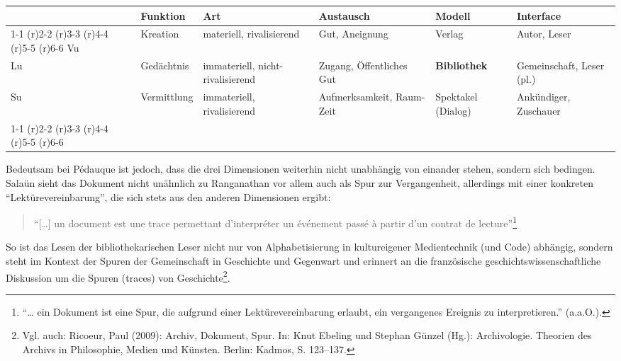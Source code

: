 \begin{sidewaystable}
\small
\begin{tabular}{p{0.5cm}p{1.5cm}p{2cm}p{3cm}p{1.5cm}p{2cm}}
 \toprule
 & Funktion & Art & Austausch & Modell & Interface \\
 \cmidrule(r){1-1} \cmidrule(r){2-2} \cmidrule(r){3-3} \cmidrule(r){4-4} \cmidrule(r){5-5} \cmidrule(r){6-6}
 Vu & Kreation & materiell, rivalisierend & Gut, Aneignung & Verlag &
 Autor, Leser\\
 Lu & Gedächtnis & immateriell, nicht-rivali\-sierend & Zugang,
 Öffentliches Gut & \textbf{Bibliothek} & Gemeinschaft, Leser
 (pl.)\\
 Su & Vermittlung & immateriell, rivalisierend & Aufmerksamkeit,
 Raum-Zeit & Spektakel (Dialog) & Ankündiger, Zuschauer\\
 \cmidrule(r){1-1} \cmidrule(r){2-2} \cmidrule(r){3-3} \cmidrule(r){4-4} \cmidrule(r){5-5} \cmidrule(r){6-6}
 \bottomrule
 \end{tabular}
 \caption*{Vu - Lu - Su (nach J.M. Salaün 2012, chap. 4; meine
 +Übertragung)}
 \end{sidewaystable}
 
Bedeutsam bei Pédauque ist jedoch, dass die drei Dimensionen weiterhin
nicht unabhängig von einander stehen, sondern sich bedingen. Salaün
sieht das Dokument nicht unähnlich zu Ranganathan vor allem auch als
Spur zur Vergangenheit, allerdings mit einer konkreten
\enquote{Lektürevereinbarung}, die sich stets aus den anderen
Dimensionen ergibt:

\begin{quote}
\enquote{{[}\ldots{}{]} un document est une trace permettant
d'interpréter un événement passé à partir d'un contrat de
lecture}\footnote{\enquote{\ldots{} ein Dokument ist eine Spur, die
  aufgrund einer Lektürevereinbarung erlaubt, ein vergangenes Ereignis
  zu interpretieren.} (a.a.O.).}
\end{quote}

So ist das Lesen der bibliothekarischen Leser nicht nur von
Alphabetisierung in kultureigener Medientechnik (und Code) abhängig,
sondern steht im Kontext der Spuren der Gemeinschaft in Geschichte und
Gegenwart und erinnert an die französische geschichtswissenschaftliche
Diskussion um die Spuren (traces) von Geschichte\footnote{Vgl. auch:
  Ricoeur, Paul (2009): Archiv, Dokument, Spur. In: Knut Ebeling und
  Stephan Günzel (Hg.): Archivologie. Theorien des Archivs in
  Philosophie, Medien und Künsten. Berlin: Kadmos, S. 123--137.}.

